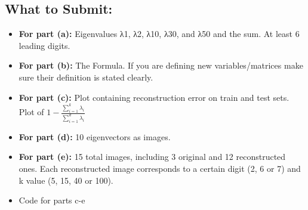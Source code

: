 \documentclass{article}
\begin{document}
\begin{aprob}
\begin{enumerate}
\end{enumerate}
 \subsection*{What to Submit:}
    \begin{itemize}

        \item \textbf{For part (a):} Eigenvalues λ1, λ2, λ10, λ30, and λ50 and the sum. At least 6 leading digits.
        \item \textbf{For part (b):} The Formula. If you are defining new variables/matrices make sure their definition is stated
        clearly.
        \item \textbf{For part (c):} Plot containing reconstruction error on train and test sets. Plot of $1-\frac{\sum_{i=1}^{k}{\lambda_i}}{\sum_{i=1}^{d}{\lambda_i}}$
        \item \textbf{For part (d):} 10 eigenvectors as images.
        \item \textbf{For part (e):} 15 total images, including 3 original and 12 reconstructed ones. Each reconstructed image
        corresponds to a certain digit (2, 6 or 7) and k value (5, 15, 40 or 100).
        \item Code for parts c-e
    \end{itemize}
\end{aprob}
\end{document}
